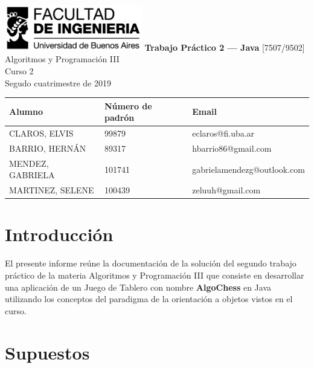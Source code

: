 \documentclass[titlepage,a4paper]{article}
\begin{document}
\begin{titlepage} %
	\hfill\includegraphics[width=6cm]{logofiuba.jpg}
    \centering
    \vfill
    \Huge \textbf{Trabajo Práctico 2 — Java}
    \vskip2cm
    \Large [7507/9502] Algoritmos y Programación III\\
    Curso 2 \\ %
    Segudo cuatrimestre de 2019 
    \vfill
    \begin{tabular}{ | l | l | l | } %
      \hline \hline
      Alumno & Número de padrón & Email\\ \hline \hline
      CLAROS, ELVIS&99879&eclaros@fi.uba.ar\\ \hline
      BARRIO, HERNÁN&89317&hbarrio86@gmail.com\\ \hline
      MENDEZ, GABRIELA&101741&gabrielamendezg@outlook.com\\ \hline
      MARTINEZ, SELENE&100439&zeluuh@gmail.com\\ \hline
  	\end{tabular}
    \vfill
    \vfill
\end{titlepage}

\tableofcontents %
\newpage

\section{Introducción}\label{sec:intro}
El presente informe reúne la documentación de la solución del segundo trabajo práctico de la materia Algoritmos y Programación III que consiste en desarrollar una aplicación de un Juego de Tablero con nombre \textbf{AlgoChess} en Java utilizando los conceptos del paradigma de la orientación a objetos vistos en el curso.

\section{Supuestos}\label{sec:supuestos}
\end{document}
